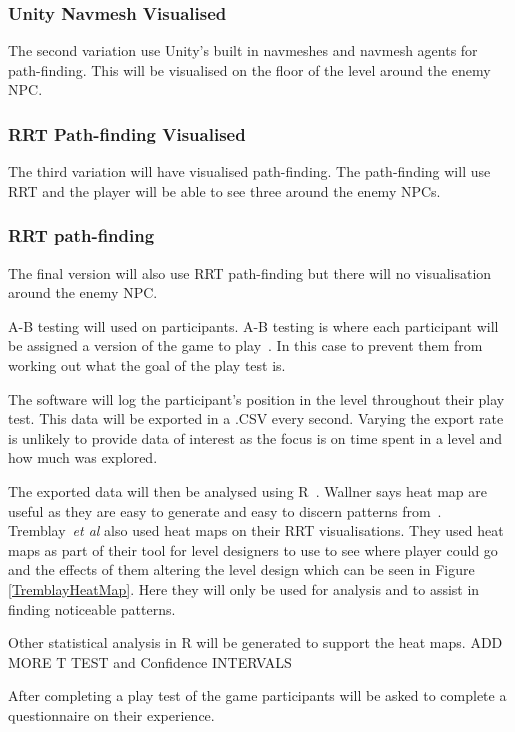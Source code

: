 \documentclass[journal]{IEEEtran}
\begin{document}
\subsubsection{Unity Navmesh Visualised}
The second variation use Unity's built in navmeshes and navmesh agents for path-finding. This will be visualised on the floor of the level around the enemy NPC.

\subsubsection{RRT Path-finding Visualised}
The third variation will have visualised path-finding. The path-finding will use RRT and the player will be able to see three around the enemy NPCs.

\subsubsection{RRT path-finding}
The final version will also use RRT path-finding but there will no visualisation around the enemy NPC.

A-B testing will used on participants. A-B testing is where each participant will be assigned a version of the game to play~\cite{Hynninen2014}. In this case to prevent them from working out what the goal of the play test is. 

The software will log the participant's position in the level throughout their play test. This data will be exported in a .CSV every second. Varying the export rate is unlikely to provide data of interest as the focus is on time spent in a level and how much was explored. 

The exported data will then be analysed using R~\cite{software:R}. Wallner says heat map are useful as they are easy to generate and easy to discern patterns from~\cite{Wallner2015}.  Tremblay~\textit{et al} also used heat maps on their RRT visualisations. They used heat maps as part of their tool for level designers to use to see where player could go and the effects of them altering the level design which can be seen in Figure \ref{TremblayHeatMap}. Here they will only be used for analysis and to assist in finding noticeable patterns.

Other statistical analysis in R will be generated to support the heat maps. ADD MORE T TEST and Confidence INTERVALS
 
After completing a play test of the game participants will be asked to complete a questionnaire on their experience.
\end{document}
